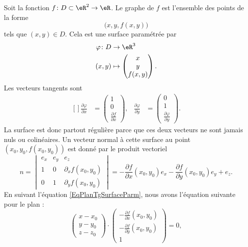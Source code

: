 Soit la fonction \( f\colon D\subset\eR^2\to \eR\). Le graphe de \( f\) est l'ensemble des points de la forme
\begin{equation}
	\big( x,y,f(x,y) \big)
\end{equation}
tels que \( (x,y)\in D\). Cela est une surface paramétrée par
\begin{equation}
	\begin{aligned}
		\varphi\colon D & \to \eR^3                           \\
		(x,y)           & \mapsto \begin{pmatrix}
			x \\
			y \\
			f(x,y)
		\end{pmatrix}.
	\end{aligned}
\end{equation}
Les vecteurs tangents sont
\begin{equation}
	\begin{aligned}[]
		\frac{ \partial \varphi }{ \partial x } & =\begin{pmatrix}
			1 \\
			0 \\
			\frac{ \partial f }{ \partial x }
		\end{pmatrix},
		                                        & \frac{ \partial \varphi }{ \partial y } & =\begin{pmatrix}
			0 \\
			1 \\
			\frac{ \partial \varphi }{ \partial y }
		\end{pmatrix}.
	\end{aligned}
\end{equation}
La surface est donc partout régulière parce que ces deux vecteurs ne sont jamais nuls ou colinéaires. Un vecteur normal à cette surface au point \( (x_0,y_0,f(x_0,y_0))\) est donné par le produit vectoriel
\begin{equation}
	n=\begin{vmatrix}
		e_x & e_y & e_z                  \\
		1   & 0   & \partial_xf(x_0,y_0) \\
		0   & 1   & \partial_yf(x_0,y_0)
	\end{vmatrix}
	=-\frac{ \partial f }{ \partial x }(x_0,y_0)e_x-\frac{ \partial f }{ \partial y }(x_0,y_0)e_y+e_z.
\end{equation}
En suivant l'équation \eqref{EqPlanTgSurfaceParm}, nous avons l'équation suivante pour le plan :
\begin{equation}
	\begin{pmatrix}
		x-x_0 \\
		y-y_0 \\
		z-z_0
	\end{pmatrix}\cdot
	\begin{pmatrix}
		-\frac{ \partial f }{ \partial x }(x_0,y_0) \\
		-\frac{ \partial f }{ \partial y }(x_0,y_0) \\
		1
	\end{pmatrix}=0,
\end{equation}

